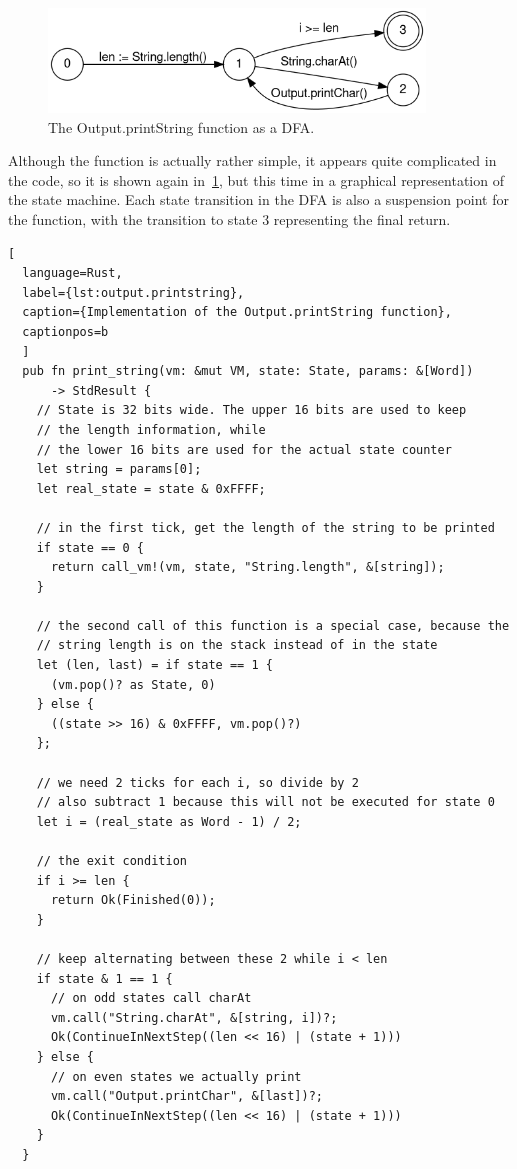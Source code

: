\begin{center}
  \begin{figure}[ht]
    \centering
    \includegraphics[width=10cm]{fig/printString.png}
    \caption{The Output.printString function as a DFA.}
    \label{fig:printstring-dfa}
  \end{figure}
\end{center}

Although the function is actually rather simple, it appears quite complicated in the code, so it is shown again in~\cref{fig:printstring-dfa}, but this time in a graphical representation of the state machine.
Each state transition in the DFA is also a suspension point for the function, with the transition to state 3 representing the final return.

\begin{lstlisting}[
  language=Rust,
  label={lst:output.printstring},
  caption={Implementation of the Output.printString function},
  captionpos=b
  ]
  pub fn print_string(vm: &mut VM, state: State, params: &[Word])
      -> StdResult {
    // State is 32 bits wide. The upper 16 bits are used to keep
    // the length information, while
    // the lower 16 bits are used for the actual state counter
    let string = params[0];
    let real_state = state & 0xFFFF;

    // in the first tick, get the length of the string to be printed
    if state == 0 {
      return call_vm!(vm, state, "String.length", &[string]);
    }

    // the second call of this function is a special case, because the
    // string length is on the stack instead of in the state
    let (len, last) = if state == 1 {
      (vm.pop()? as State, 0)
    } else {
      ((state >> 16) & 0xFFFF, vm.pop()?)
    };

    // we need 2 ticks for each i, so divide by 2
    // also subtract 1 because this will not be executed for state 0
    let i = (real_state as Word - 1) / 2;

    // the exit condition
    if i >= len {
      return Ok(Finished(0));
    }

    // keep alternating between these 2 while i < len
    if state & 1 == 1 {
      // on odd states call charAt
      vm.call("String.charAt", &[string, i])?;
      Ok(ContinueInNextStep((len << 16) | (state + 1)))
    } else {
      // on even states we actually print
      vm.call("Output.printChar", &[last])?;
      Ok(ContinueInNextStep((len << 16) | (state + 1)))
    }
  }
\end{lstlisting}

